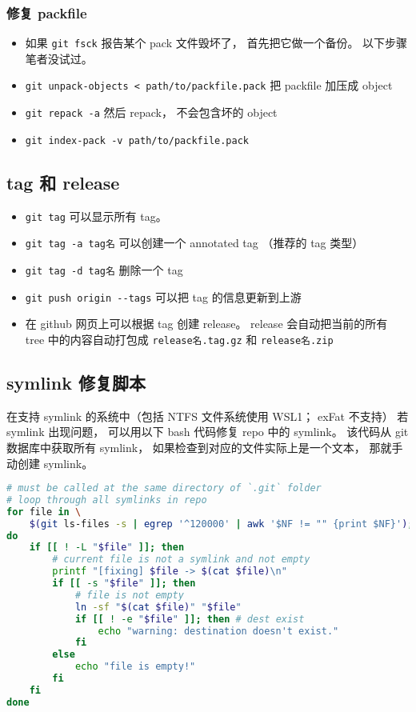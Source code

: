 \subsubsection{修复 packfile}
\begin{itemize}
\item 如果 \verb`git fsck` 报告某个 pack 文件毁坏了， 首先把它做一个备份。 以下步骤笔者没试过。
\item \verb`git unpack-objects < path/to/packfile.pack` 把 packfile 加压成 object
\item \verb`git repack -a` 然后 repack， 不会包含坏的 object
\item \verb`git index-pack -v path/to/packfile.pack` 
\end{itemize}

\subsection{tag 和 release}
\begin{itemize}
\item \verb`git tag` 可以显示所有 tag。
\item \verb`git tag -a tag名` 可以创建一个 annotated tag （推荐的 tag 类型）
\item \verb`git tag -d tag名` 删除一个 tag
\item \verb`git push origin --tags` 可以把 tag 的信息更新到上游
\item 在 github 网页上可以根据 tag 创建 release。 release 会自动把当前的所有 tree 中的内容自动打包成 \verb`release名.tag.gz` 和 \verb`release名.zip`
\end{itemize}

\subsection{symlink 修复脚本}

在支持 symlink 的系统中（包括 NTFS 文件系统使用 WSL1； exFat 不支持） 若 symlink 出现问题， 可以用以下 bash 代码修复 repo 中的 symlink。 该代码从 git 数据库中获取所有 symlink， 如果检查到对应的文件实际上是一个文本， 那就手动创建 symlink。

\begin{lstlisting}[language=bash, caption=fix\_git\_symlink.sh]
# must be called at the same directory of `.git` folder
# loop through all symlinks in repo
for file in \
	$(git ls-files -s | egrep '^120000' | awk '$NF != "" {print $NF}');
do
	if [[ ! -L "$file" ]]; then
		# current file is not a symlink and not empty
		printf "[fixing] $file -> $(cat $file)\n"
		if [[ -s "$file" ]]; then
			# file is not empty
			ln -sf "$(cat $file)" "$file"
			if [[ ! -e "$file" ]]; then # dest exist
				echo "warning: destination doesn't exist."
			fi
		else
			echo "file is empty!"
		fi
	fi
done
\end{lstlisting}

